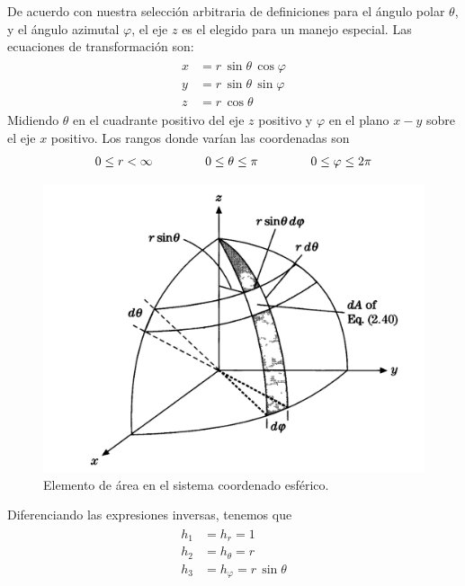 De acuerdo con nuestra selección arbitraria de definiciones para el ángulo polar $\theta$, y el ángulo azimutal $\varphi$, el eje $z$ es el elegido para un manejo especial. Las ecuaciones de transformación son:
\begin{align}
\begin{aligned}
x &= r \, \sin \theta \, \cos \varphi \\
y &= r \, \sin \theta \, \sin \varphi \\
z &= r \, \cos \theta
\end{aligned}
\label{eq:ecuacion_02_038}
\end{align}
Midiendo $\theta$ en el cuadrante positivo del eje $z$ positivo y $\varphi$ en el plano $x-y$ sobre el eje $x$ positivo. Los rangos donde varían las coordenadas son
\begin{align*}
0 \leq r < \infty \hspace{1.5cm} 0 \leq \theta \leq \pi \hspace{1.5cm} 0 \leq \varphi \leq 2 \pi
\end{align*}
\begin{figure}[H]
    \centering
    \includegraphics[scale=0.35]{Imagenes/Elemento_Area_Esferico}
    \caption{Elemento de área en el sistema coordenado esférico.}
    \label{fig:figura_elemento_area_esferico}
\end{figure}
Diferenciando las expresiones inversas, tenemos que 
\begin{align}
\begin{aligned}
h_{1} &= h_{r} = 1 \\
h_{2} &= h_{\theta} = r \\
h_{3} &= h_{\varphi} = r \, \sin \theta 
\end{aligned}
\label{eq:ecuacion_02_039}
\end{align}
